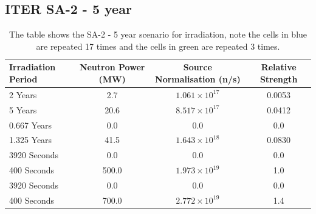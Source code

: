 \documentclass[12pt]{article}
\begin{document}
\subsection{ITER SA-2 - 5 year}
\begin{table}[ht!]
   \begin{tabular}{| l | c | c | c |}
      \hline 
      Irradiation Period & Neutron Power (MW) & Source Normalisation (n/s) &  Relative Strength \\
      \hline
      2 Years & 2.7 & $1.061\times10^{17}$ & 0.0053 \\
      5 Years & 20.6 & $8.517\times10^{17}$ & 0.0412 \\
      0.667 Years & 0.0 & 0.0 & 0.0 \\
      1.325 Years & 41.5 & $1.643\times10^{18}$ & 0.0830 \\
      \cellcolor{blue!25} 3920 Seconds & \cellcolor{blue!25} 0.0 & \cellcolor{blue!25} 0.0 & \cellcolor{blue!25} 0.0 \\
      \cellcolor{blue!25} \cellcolor{blue!25} 400 Seconds & \cellcolor{blue!25} 500.0 & \cellcolor{blue!25} $1.973\times10^{19}$ & \cellcolor{blue!25} 1.0  \\
      \cellcolor{green!25} 3920 Seconds & \cellcolor{green!25} 0.0 & \cellcolor{green!25} 0.0 &\cellcolor{green!25} 0.0 \\
      \cellcolor{green!25} 400 Seconds & \cellcolor{green!25} 700.0 & \cellcolor{green!25} $2.772\times10^{19}$ &\cellcolor{green!25} 1.4 \\
      \hline
\end{tabular}
\caption{The table shows the SA-2 - 5 year scenario for irradiation, note the
         cells in \textcolor{blue!25}{blue} are repeated 17 times
         and the cells in \textcolor{green!25}{green} are repeated 3
         times.}
\end{table}
\end{document}
